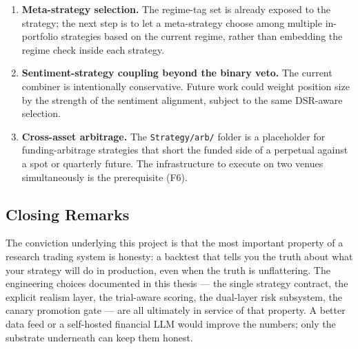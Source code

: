 \documentclass[a4paper, 12pt, titlepage]{article}
\begin{document}
\begin{enumerate}[label=F\arabic*.,start=8,leftmargin=2.4em]
    \item \textbf{Meta-strategy selection.} The regime-tag set is
    already exposed to the strategy; the next step is to let a
    meta-strategy choose among multiple in-portfolio strategies
    based on the current regime, rather than embedding the regime
    check inside each strategy.
    \item \textbf{Sentiment-strategy coupling beyond the binary
    veto.} The current combiner is intentionally conservative.
    Future work could weight position size by the strength of the
    sentiment alignment, subject to the same DSR-aware selection.
    \item \textbf{Cross-asset arbitrage.} The \texttt{Strategy/arb/}
    folder is a placeholder for funding-arbitrage strategies that
    short the funded side of a perpetual against a spot or
    quarterly future. The infrastructure to execute on two venues
    simultaneously is the prerequisite (F6).
\end{enumerate}

\subsection{Closing Remarks}

The conviction underlying this project is that the most important
property of a research trading system is honesty: a backtest that
tells you the truth about what your strategy will do in production,
even when the truth is unflattering. The engineering choices
documented in this thesis --- the single strategy contract, the
explicit realism layer, the trial-aware scoring, the dual-layer
risk subsystem, the canary promotion gate --- are all ultimately in
service of that property. A better data feed or a self-hosted
financial LLM would improve the numbers; only the substrate
underneath can keep them honest.

\newpage


\end{document}
